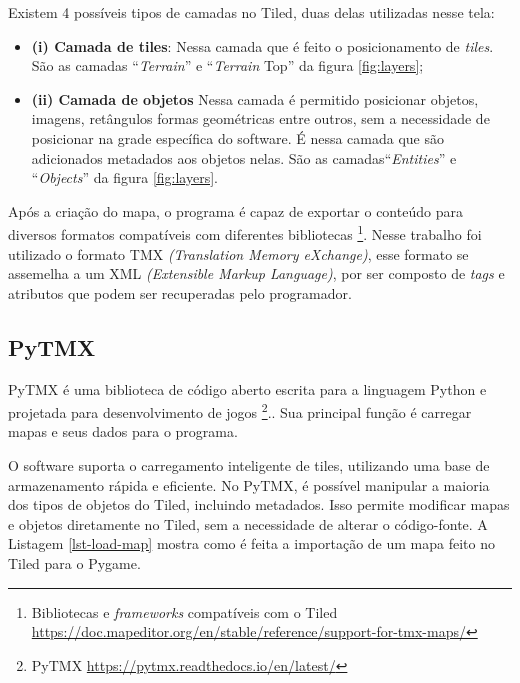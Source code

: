 Existem 4 possíveis tipos de camadas no Tiled, duas delas utilizadas nesse tela: 
\begin{itemize}
    \item \textbf{(i) Camada de tiles}: Nessa camada que é feito o posicionamento de \textit{tiles}. São as camadas ``\textit{Terrain}'' e ``\textit{Terrain} Top'' da figura \ref{fig:layers};
    \item \textbf{(ii) Camada de objetos}  Nessa camada é permitido posicionar objetos, imagens, retângulos formas geométricas entre outros, sem a necessidade de posicionar na grade específica do software. É nessa camada que são adicionados metadados aos objetos nelas. São as camadas``\textit{Entities}'' e ``\textit{Objects}'' da figura \ref{fig:layers}.
\end{itemize}


Após a criação do mapa, o programa é capaz de exportar o conteúdo para diversos formatos compatíveis com diferentes bibliotecas \footnote{Bibliotecas e \textit{frameworks} compatíveis com o Tiled \url{https://doc.mapeditor.org/en/stable/reference/support-for-tmx-maps/}}. Nesse trabalho foi utilizado o formato TMX \textit{(Translation Memory eXchange)}, esse formato se assemelha a um XML \textit{ (Extensible Markup Language)}, por ser composto de \textit{tags} e atributos que podem ser recuperadas pelo programador.


\subsection{PyTMX}
\label{sec:pytmx}
PyTMX é uma biblioteca de código aberto escrita para a linguagem Python e projetada para desenvolvimento de jogos \footnote{PyTMX \url{https://pytmx.readthedocs.io/en/latest/}}.. Sua principal função é carregar mapas e seus dados para o programa.

O software suporta o carregamento inteligente de tiles, utilizando uma base de armazenamento rápida e eficiente. No PyTMX, é possível manipular a maioria dos tipos de objetos do Tiled, incluindo metadados. Isso permite modificar mapas e objetos diretamente no Tiled, sem a necessidade de alterar o código-fonte. A Listagem \ref{lst-load-map} mostra como é feita a importação de um mapa feito no Tiled para o Pygame.

